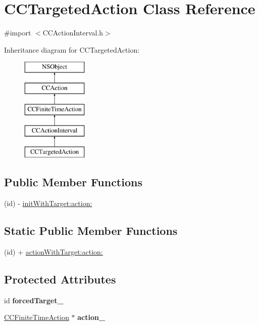 \hypertarget{interface_c_c_targeted_action}{\section{C\-C\-Targeted\-Action Class Reference}
\label{interface_c_c_targeted_action}
}


{\ttfamily \#import $<$C\-C\-Action\-Interval.\-h$>$}

Inheritance diagram for C\-C\-Targeted\-Action\-:\begin{figure}[H]
\begin{center}
\leavevmode
\includegraphics[height=5.000000cm]{interface_c_c_targeted_action}
\end{center}
\end{figure}
\subsection*{Public Member Functions}
\begin{DoxyCompactItemize}
\item 
(id) -\/ \hyperlink{interface_c_c_targeted_action_ae309e1906ed305f2b96ee7b4fb9ce2cd}{init\-With\-Target\-:action\-:}
\end{DoxyCompactItemize}
\subsection*{Static Public Member Functions}
\begin{DoxyCompactItemize}
\item 
(id) + \hyperlink{interface_c_c_targeted_action_a0c1ffe9d530caf7a5f335e351c06b40a}{action\-With\-Target\-:action\-:}
\end{DoxyCompactItemize}
\subsection*{Protected Attributes}
\begin{DoxyCompactItemize}
\item 
\hypertarget{interface_c_c_targeted_action_ac5b93da95e67d9f771714e4a612d9e53}{id {\bfseries forced\-Target\-\_\-}}\label{interface_c_c_targeted_action_ac5b93da95e67d9f771714e4a612d9e53}

\item 
\hypertarget{interface_c_c_targeted_action_a88b7ef25317bc28f002eebeac57aec36}{\hyperlink{interface_c_c_finite_time_action}{C\-C\-Finite\-Time\-Action} $\ast$ {\bfseries action\-\_\-}}\label{interface_c_c_targeted_action_a88b7ef25317bc28f002eebeac57aec36}

\end{DoxyCompactItemize}
